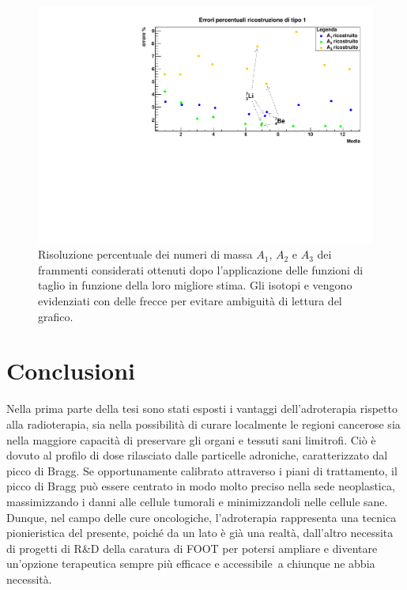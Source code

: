 \documentclass[12pt,a4paper,twoside]{report}
\begin{document}
	\begin{figure}[H]
		\centering
		\includegraphics[width=.97\linewidth]{c_multigr_final.pdf}
		\caption{Risoluzione percentuale dei numeri di massa $A_1$, $A_2$ e $A_3$ dei frammenti considerati ottenuti dopo l'applicazione delle funzioni di taglio in funzione della loro migliore stima. Gli isotopi  e  vengono evidenziati con delle frecce per evitare ambiguità di lettura del grafico.}
		\label{fig:number_mass_resolution}
	\end{figure}
	
	\chapter*{Conclusioni}
	Nella prima parte della tesi sono stati esposti i vantaggi dell'adroterapia rispetto alla radioterapia, sia nella possibilità di curare localmente le regioni cancerose sia nella maggiore capacità di preservare gli organi e tessuti sani limitrofi. Ciò è dovuto al profilo di dose rilasciato dalle particelle adroniche, caratterizzato dal picco di Bragg. Se opportunamente calibrato attraverso i piani di trattamento, il picco di Bragg può essere centrato in modo molto preciso nella sede neoplastica, massimizzando i danni alle cellule tumorali e minimizzandoli nelle cellule sane. Dunque, nel campo delle cure oncologiche, l'adroterapia rappresenta una tecnica pionieristica del presente, poiché da un lato è già una realtà, dall'altro necessita di progetti di R\&D della caratura di FOOT per potersi ampliare e diventare un'opzione terapeutica sempre più efficace e accessibile a chiunque ne abbia necessità.
		
\end{document}
